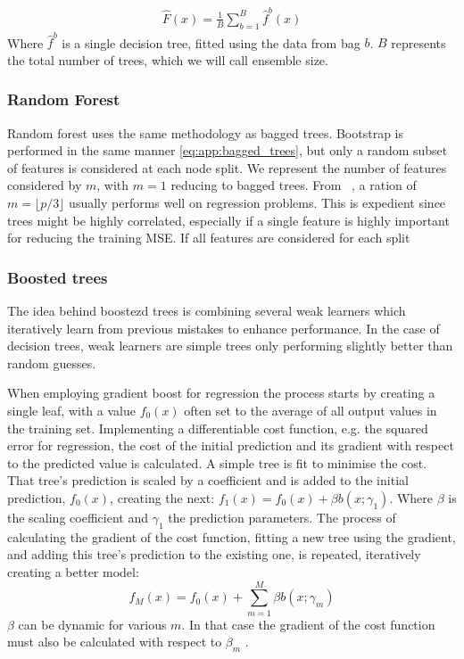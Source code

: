             \begin{align}
                \hat{F}(x) = \frac{1}{B}\sum_{b = 1}^{B} \hat{f}^b (x) \label{eq:app:bagged_trees}
            \end{align}
            Where $\hat{f}^b$ is a single decision tree, fitted using the data from bag $b$. $B$ represents the total number of trees, which we will call ensemble size.

            \subsubsection{Random Forest}
            Random forest uses the same methodology as bagged trees. Bootstrap is performed in the same manner \cref{eq:app:bagged_trees}, but only a random subset of features is considered at each node split. We represent the number of features considered by $m$, with $m = 1$ reducing to bagged trees. From ~\citep{hastie01statisticallearning}, a ration of $m = \lfloor p/3 \rfloor$ usually performs well on regression problems. This is expedient since trees might be highly correlated, especially if a single feature is highly important for reducing the training MSE. If all features are considered for each split 
            
            \subsubsection{Boosted trees}
                The idea behind boostezd trees is combining several weak learners which iteratively learn from previous mistakes to enhance performance. In the case of decision trees, weak learners are simple trees only performing slightly better than random guesses. 

                When employing gradient boost for regression the process starts by creating a single leaf, with a value $f_0(x)$ often set to the average of all output values in the training set. Implementing a differentiable cost function, e.g. the squared error for regression, the cost of the initial prediction and its gradient with respect to the predicted value is calculated. A simple tree is fit to minimise the cost. That tree's prediction is scaled by a coefficient and is added to the initial prediction, $f_0(x)$, creating the next: $f_1(x) = f_0(x) + \beta b(x;\gamma_1)$. Where $\beta$ is the scaling coefficient and $\gamma_1$ the prediction parameters. The process of calculating the gradient of the cost function, fitting a new tree using the gradient, and adding this tree's prediction to the existing one, is repeated, iteratively creating a better model: 
                \begin{equation}
                    f_M(x) = f_0(x) + \sum_{m=1}^M \beta b(x; \gamma_m)
                \end{equation}
                $\beta$ can be dynamic for various $m$. In that case the gradient of the cost function must also be calculated with respect to $\beta_m$ \citep{hastie01statisticallearning}. 


